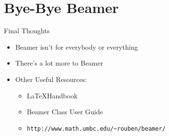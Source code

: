 \documentclass[mathserif, xcolor=svgnames]{beamer}
\begin{document}
\section{Bye-Bye Beamer}
\begin{frame}[fragile]{Final Thoughts}
\begin{itemize}
\item Beamer isn't for everybody or everything
\item There's a lot more to Beamer
\item Other Useful Resources:

\begin{itemize}
\item \LaTeX Handbook
\item Beamer Class User Guide
\item \verb+http://www.math.umbc.edu/~rouben/beamer/ +
\end{itemize}

\end{itemize}

\end{frame}
\end{document}
